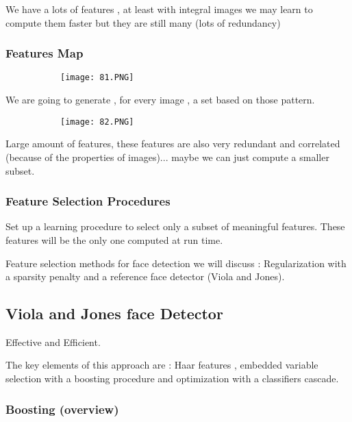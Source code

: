 \documentclass{article}
\begin{document}
We have a lots of features , at least with integral images we may learn to compute them faster but they are still many (lots of redundancy)

\subsubsection{Features Map}

\begin{figure}[ht!]
  \centering
  \begin{subfigure}[b]{0.6\linewidth}
    \texttt{[image: 81.PNG]}
  \end{subfigure}
\end{figure}

We are going to generate , for every image , a set based on those pattern.

\begin{figure}[ht!]
  \centering
  \begin{subfigure}[b]{0.6\linewidth}
    \texttt{[image: 82.PNG]}
  \end{subfigure}
\end{figure}

Large amount of features, these features are also very redundant and correlated (because of the properties of images)... maybe we can just compute a smaller subset.


\subsubsection{Feature Selection Procedures}

Set up a learning procedure to select only a subset of meaningful features. These features will be the only one computed at run time.

Feature selection methods for face detection we will discuss : Regularization with a sparsity penalty and a reference face detector (Viola and Jones).


\subsection{Viola and Jones face Detector}

Effective and Efficient. 

The key elements of this approach are : Haar features , embedded variable selection with a boosting procedure and optimization with a classifiers cascade.

\subsubsection{Boosting (overview)}
\end{document}
